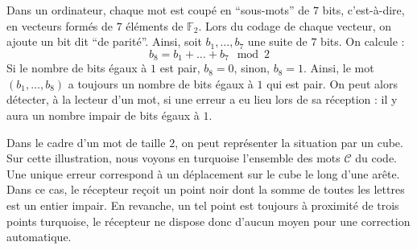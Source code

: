  \begin{example}
    Dans un ordinateur, chaque mot est coupé en ``sous-mots'' de $7$ bits, c'est-à-dire, en vecteurs formés de $7$ éléments de $\mathbb{F}_2$. Lors du codage de chaque vecteur, on ajoute un bit dit ``de parité''.
    \newpar
    Ainsi, soit $b_1, \dots, b_7$ une suite de $7$ bits. On calcule :
    \[ b_8 = b_1 + \dots + b_7 \mod 2 \]
    Si le nombre de bits égaux à $1$ est pair, $b_8 = 0$, sinon, $b_8 = 1$. Ainsi, le mot $(b_1, \dots, b_8)$ a toujours un nombre de bits égaux à $1$ qui est pair. On peut alors détecter, à la lecteur d'un mot, si une erreur a eu lieu lors de sa réception : il y aura un nombre impair de bits égaux à $1$.
    \newpar
    \begin{minipage}{0.45\textwidth}
      Dans le cadre d'un mot de taille $2$, on peut représenter la situation par un cube. Sur cette illustration, nous voyons en turquoise l'ensemble des mots $\mathcal{C}$ du code. Une unique erreur correspond à un déplacement sur le cube le long d'une arête. Dans ce cas, le récepteur reçoit un point noir dont la somme de toutes les lettres est un entier impair. En revanche, un tel point est toujours à proximité de trois points turquoise, le récepteur ne dispose donc d'aucun moyen pour une correction automatique.
    \end{minipage}
    \hfill
    \begin{minipage}{0.45\textwidth}
      \begin{figure}[H]
        \begin{center}
\end{center}
\end{figure}
\end{minipage}
\end{example}
